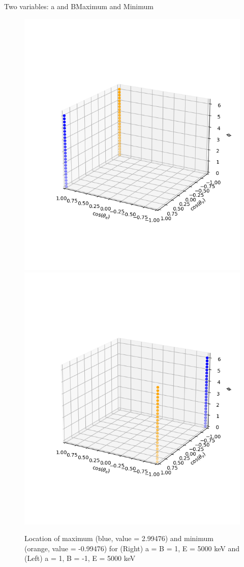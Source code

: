 \documentclass{beamer}
\begin{document}
\begin{frame}{Two variables: a and B}{Maximum and Minimum}
	\begin{figure}
		\centering
		\includegraphics[width=0.4\paperwidth]{plots/posa_posB_hiE_max_min}
		\includegraphics[width=0.4\paperwidth]{plots/posa_negB_hiE_max_min}
		\caption{Location of maximum (blue, value = 2.99476) and minimum (orange, value = -0.99476) for (Right) a = B = 1, E = 5000 keV and (Left) a = 1, B = -1, E = 5000 keV}
	\end{figure}
\end{frame}
\end{document}
